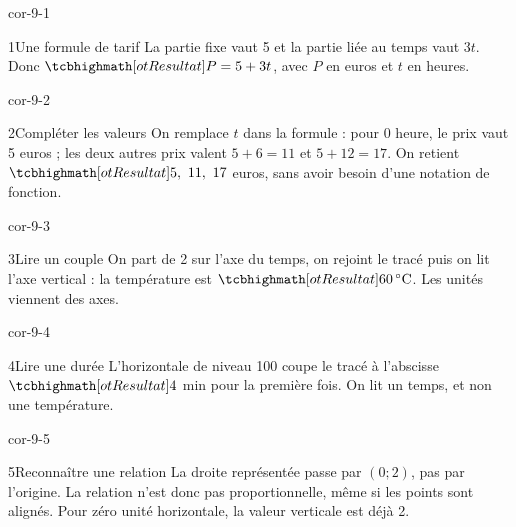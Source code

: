 \clearpage\pagestyle{otMain}\setlength{\otBlocEspacement}{2.5mm}\fontsize{11}{15}\selectfont{}
\begin{blocLivre}{cor-9-1}\begin{corrige}{1}{Une formule de tarif}
La partie fixe vaut 5 et la partie liée au temps vaut $3t$. Donc $\res{P=5+3t}$, avec $P$ en euros et $t$ en heures.
\end{corrige}\end{blocLivre}
\begin{blocLivre}{cor-9-2}\begin{corrige}{2}{Compléter les valeurs}
On remplace $t$ dans la formule : pour 0 heure, le prix vaut 5 euros ; les deux autres prix valent $5+6=11$ et $5+12=17$. On retient $\res{5,\ 11,\ 17}$ euros, sans avoir besoin d’une notation de fonction.
\end{corrige}\end{blocLivre}
\begin{blocLivre}{cor-9-3}\begin{corrige}{3}{Lire un couple}
On part de 2 sur l’axe du temps, on rejoint le tracé puis on lit l’axe vertical : la température est $\res{60\,^\circ\mathrm C}$. Les unités viennent des axes.
\label{fig-cor-9-3}
\end{corrige}\end{blocLivre}
\begin{blocLivre}{cor-9-4}\begin{corrige}{4}{Lire une durée}
L’horizontale de niveau 100 coupe le tracé à l’abscisse $\res4$ min pour la première fois. On lit un temps, et non une température.
\label{fig-cor-9-4}
\end{corrige}\end{blocLivre}
\begin{blocLivre}{cor-9-5}\begin{corrige}{5}{Reconnaître une relation}
La droite représentée passe par $(0;2)$, pas par l’origine. La relation n’est donc pas proportionnelle, même si les points sont alignés. Pour zéro unité horizontale, la valeur verticale est déjà 2.
\label{fig-cor-9-5}
\end{corrige}\end{blocLivre}
